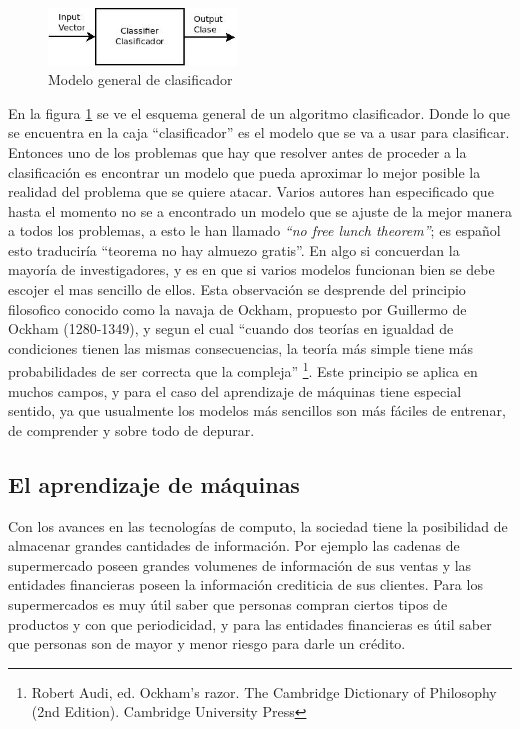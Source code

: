 \documentclass[a4paper, 11pt, oneside]{report}
\begin{document}
\begin{figure}[htb]
\begin{center}
\leavevmode
\includegraphics[width=5cm]{diagrams/classifier1.jpg}
\end{center}
\caption{Modelo general de clasificador}
\label{fig:classif1}
\end{figure}

En la figura \ref{fig:classif1} se ve el esquema general de un algoritmo clasificador. Donde lo que se encuentra en la caja ``clasificador'' es el modelo que se va a usar para clasificar. Entonces uno de los problemas que hay que resolver antes de proceder a la clasificación es encontrar un modelo que pueda aproximar lo mejor posible la realidad del problema que se quiere atacar. Varios autores han especificado que hasta el momento no se a encontrado un modelo que se ajuste de la mejor manera a todos los problemas, a esto le han llamado {\it ``no free lunch theorem''}; es español esto traduciría ``teorema no hay almuezo gratis''. En algo si concuerdan la mayoría de investigadores, y es en que si varios modelos funcionan bien se debe escojer el mas sencillo de ellos. Esta observación se desprende del principio filosofico conocido como la navaja de Ockham, propuesto por Guillermo de Ockham (1280-1349), y segun el cual ``cuando dos teorías en igualdad de condiciones tienen las mismas consecuencias, la teoría más simple tiene más probabilidades de ser correcta que la compleja'' \footnote{Robert Audi, ed. Ockham's razor. The Cambridge Dictionary of Philosophy (2nd Edition). Cambridge University Press}. Este principio se aplica en muchos campos, y para el caso del aprendizaje de máquinas tiene especial sentido, ya que usualmente los modelos más sencillos son más fáciles de entrenar, de comprender y sobre todo de depurar.

\subsection{El aprendizaje de máquinas}

Con los avances en las tecnologías de computo, la sociedad tiene la posibilidad de almacenar grandes cantidades de información. Por ejemplo las cadenas de supermercado poseen grandes volumenes de información de sus ventas y las entidades financieras poseen la información crediticia de sus clientes. Para los supermercados es muy útil saber que personas compran ciertos tipos de productos y con que periodicidad, y para las entidades financieras es útil saber que personas son de mayor y menor riesgo para darle un crédito.\newline
\end{document}
